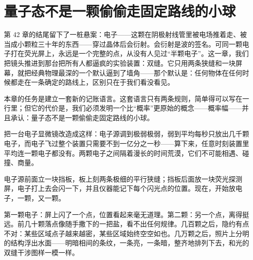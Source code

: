 \chapter{量子态不是一颗偷偷走固定路线的小球}

第 42 章的结尾留下了一桩悬案：电子——这颗在阴极射线管里被电场推着走、被当成小颗粒三十年的东西——穿过晶体后会衍射。会衍射是波的签名。可同一颗电子打在荧光屏上，永远是一个完整的点，从没有人见过“半颗电子”。这一章，我们把镜头推进到那台把所有人都逼疯的实验装置：双缝。它只用两条狭缝和一块屏幕，就把经典物理最深的一个默认逼到了墙角——那个默认是：任何物体在任何时候都走在一条确定的路线上，区别只在于我们看没看见。

本章的任务是建立一套新的记账语言。这套语言只有两条规则，简单得可以写在一行里；但它的代价是，我们必须发明一个比“概率”更原始的概念——概率幅——并且承认：量子态不是一颗偷偷走固定路线的小球。


把一台电子显微镜改造成这样：电子源调到极弱极弱，弱到平均每秒只放出几千颗电子，而电子飞过整个装置只需要不到一亿分之一秒——算下来，任意时刻装置里平均连一颗电子都没有。两颗电子之间隔着漫长的时间荒漠，它们不可能相遇、碰撞、商量。

电子源前面立一块挡板，板上刻两条极细的平行狭缝；挡板后面放一块荧光探测屏，电子打上去会闪一下，并且仪器能记下每个闪光点的位置。现在，开始放电子，一颗，又一颗。


第一颗电子：屏上闪了一个点，位置看起来毫无道理。第二颗：另一个点，离得挺远。前几十颗落点像随手撒下的一把盐，看不出任何规律。几百颗之后，隐约有点不对：某些区域点子越来越密，某些区域始终空空如也。几万颗之后，照片上分明的结构浮出水面——明暗相间的条纹，一条亮，一条暗，整齐地排列下去，和光的双缝干涉图样一模一样。

